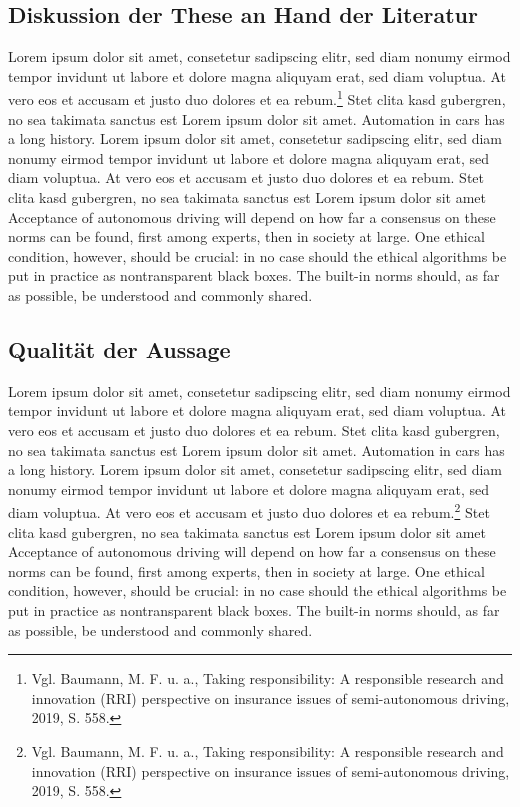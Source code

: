 \subsection{Diskussion der These an Hand der Literatur}
	      	      	      	      	      
Lorem ipsum dolor sit amet, consetetur sadipscing elitr, sed diam nonumy eirmod tempor invidunt ut labore et dolore magna aliquyam erat, sed diam voluptua. 
At vero eos et accusam et justo duo dolores et ea rebum.\footnote{Vgl. Baumann, M. F. u. a., Taking responsibility: A responsible research and innovation (RRI) perspective on insurance issues of semi-autonomous driving, 2019, S. 558.} 
Stet clita kasd gubergren, no sea takimata sanctus est Lorem ipsum dolor sit amet. 
Automation in cars has a long history.  Lorem ipsum dolor sit amet, consetetur sadipscing elitr, sed diam nonumy eirmod tempor invidunt ut labore et dolore magna aliquyam erat, sed diam voluptua. 
At vero eos et accusam et justo duo dolores et ea rebum. 
Stet clita kasd gubergren, no sea takimata sanctus est Lorem ipsum dolor sit amet Acceptance of autonomous driving will depend on how far a consensus on these norms can be found, first among experts, then in society at large. 
One ethical condition, however, should be crucial: in no case should the ethical algorithms be put in practice as nontransparent black boxes. 
The built-in norms should, as far as possible, be understood and commonly shared.
	      	      	      	      	      
\subsection{Qualität der Aussage}
	      	      	      	      	      
Lorem ipsum dolor sit amet, consetetur sadipscing elitr, sed diam nonumy eirmod tempor invidunt ut labore et dolore magna aliquyam erat, sed diam voluptua. 
At vero eos et accusam et justo duo dolores et ea rebum. 
Stet clita kasd gubergren, no sea takimata sanctus est Lorem ipsum dolor sit amet. 
Automation in cars has a long history.  Lorem ipsum dolor sit amet, consetetur sadipscing elitr, sed diam nonumy eirmod tempor invidunt ut labore et dolore magna aliquyam erat, sed diam voluptua. 
At vero eos et accusam et justo duo dolores et ea rebum.\footnote{Vgl. Baumann, M. F. u. a., Taking responsibility: A responsible research and innovation (RRI) perspective on insurance issues of semi-autonomous driving, 2019, S. 558.}
Stet clita kasd gubergren, no sea takimata sanctus est Lorem ipsum dolor sit amet Acceptance of autonomous driving will depend on how far a consensus on these norms can be found, first among experts, then in society at large. 
One ethical condition, however, should be crucial: in no case should the ethical algorithms be put in practice as nontransparent black boxes. 
The built-in norms should, as far as possible, be understood and commonly shared.
	      	      	      	      	      
